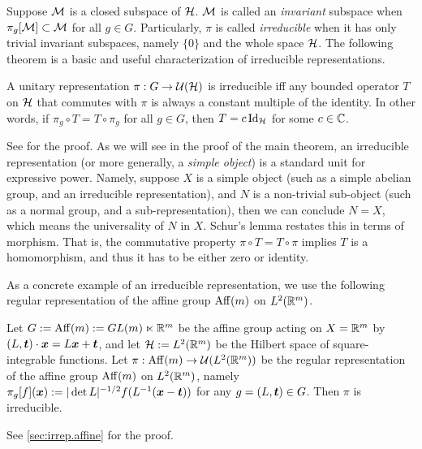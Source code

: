 Suppose $\calM$ is a closed subspace of $\calH$. $\calM$ is called an \emph{invariant} subspace when $\pi_g[\calM] \subset \calM$ for all $g \in G$. Particularly, $\pi$ is called \emph{irreducible} when it has only trivial invariant subspaces, namely $\{0\}$ and the whole space $\calH$.
The following theorem is a basic and useful characterization of irreducible representations.
\begin{theorem} \label{thm:schur}
A unitary representation $\pi : G \to \calU(\calH)$ is irreducible iff 
any bounded operator $T$ on $\calH$ that commutes with $\pi$ is always a constant multiple of the identity. In other words, if $\pi_g \circ T=T \circ \pi_g$ for all $g \in G$, then $T=c \id_{\calH}$ for some $c \in \CC$.
\end{theorem}
See %
\citet[Theorem~3.5(a)]{Folland2015} for the proof. %
As we will see in the proof of the main theorem, an irreducible representation (or more generally, a \emph{simple object}) is a standard unit for expressive power. Namely, suppose $X$ is a simple object (such as a simple abelian group, and an irreducible representation), 
and $N$ is a non-trivial sub-object (such as a normal group, and a sub-representation), then we can conclude $N=X$, which means the universality of $N$ in $X$. Schur's lemma restates this in terms of morphism. That is, the commutative property $\pi \circ T = T \circ \pi$ implies $T$ is a homomorphism, and thus it has to be either zero or identity.

As a concrete example of an irreducible representation, we use the following regular representation of the affine group $\aff(m)$ on $L^2(\RR^m)$.
\begin{theorem} \label{thm:aff.irrep}
Let $G := \aff(m) := GL(m) \ltimes \RR^m$ be the affine group acting on $X=\RR^m$ by $(L,\tt) \cdot \xx = L\xx+\tt$, and let $\calH := L^2(\RR^m)$ be the Hilbert space of square-integrable functions.
Let $\pi : \aff(m) \to \calU(L^2(\RR^m))$ be the regular representation of the affine group $\aff(m)$ on $L^2(\RR^m)$, namely $\pi_g[f](\xx) := |\det L|^{-1/2} f( L^{-1}(\xx-\tt) )$ for any $g=(L,\tt) \in G$. Then $\pi$ is irreducible.
\end{theorem}
See \cref{sec:irrep.affine} for the proof.


